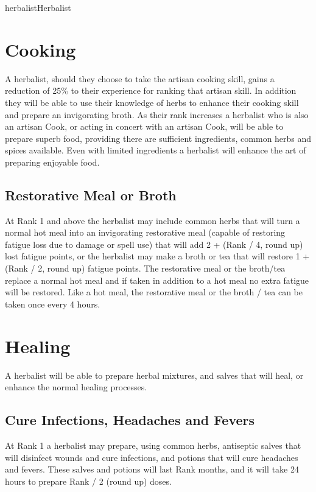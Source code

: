 \begin{Skill}[1.1]{herbalist}{Herbalist}
\section{Cooking}

A herbalist, should they choose to take the artisan cooking skill,
gains a reduction of 25\% to their experience for ranking that artisan
skill.  In addition they will be able to use their knowledge of herbs
to enhance their cooking skill and prepare an invigorating broth.
As their rank increases a herbalist who is also an artisan Cook, or
acting in concert with an artisan Cook, will be able to prepare superb
food, providing there are sufficient ingredients, common herbs and
spices available.  Even with limited ingredients a herbalist will
enhance the art of preparing enjoyable food.

\subsection{Restorative Meal or Broth}

At Rank 1 and above the herbalist may include common herbs that will
turn a normal hot meal into an invigorating restorative meal (capable
of restoring fatigue loss due to damage or spell use) that will add 2
+ (Rank / 4, round up) lost fatigue points, or the herbalist may make
a broth or tea that will restore 1 + (Rank / 2, round up) fatigue
points.  The restorative meal or the broth/tea replace a normal hot
meal and if taken in addition to a hot meal no extra fatigue will be
restored.  Like a hot meal, the restorative meal or the broth / tea
can be taken once every 4 hours.

\section{Healing}

A herbalist will be able to prepare herbal mixtures, and salves that
will heal, or enhance the normal healing processes.

\subsection{Cure Infections, Headaches and Fevers}

At Rank 1 a herbalist may prepare, using common herbs, antiseptic
salves that will disinfect wounds and cure infections, and potions
that will cure headaches and fevers.  These salves and potions will
last Rank months, and it will take 24 hours to prepare Rank / 2 (round
up) doses.


\end{Skill}
